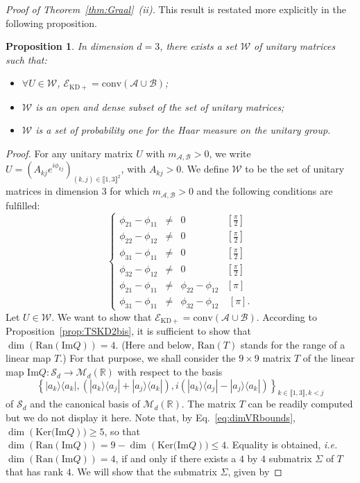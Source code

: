 \documentclass[a4paper, notitlepage, 11pt]{article}
\numberwithin{equation}{section}
\newcommand{\bra}[1]{\langle #1|}
\newcommand{\cket}[1]{|#1\rangle}
\newcommand{\mcl}[1]{\mathcal{#1}}
\newcommand{\Acal}{{\mathcal A}}
\newcommand{\Bcal}{{\mathcal B}}
\newcommand{\EcalKDC}{{\mathcal E}_{\mathrm{KD+}}}
\newcommand{\Ker}{{\mathrm{Ker}}}
\newcommand{\R}{\mathbb{R}}
\newcommand{\mab}{m_{\Acal,\Bcal}}
\newcommand{\conv}[1]{\mathrm{conv}\left(#1\right)}
\renewcommand{\Im}[1]{\mathrm{Im}#1}
\newcommand{\Ran}[1]{\mathrm{Ran}\left(#1\right)}
\newcommand{\SAO}{\mathcal{S}_{d}}
\newcommand{\MatR}[1]{\mcl{M}_{#1}(\R)}
\newcommand{\IntEnt}[2]{\llbracket #1 , #2 \rrbracket}
\newcommand{\convAB}{\conv{\Acal \cup \Bcal}}
\newtheorem{Prop}[Theorem]{Proposition}
\begin{document}
\noindent \emph{Proof of Theorem~\ref{thm:Graal}~(ii).}
This result is restated more explicitly  in the following proposition. 

\begin{Prop}
In dimension $d=3$, there exists a set $\mathcal W$ of unitary matrices such that:
\begin{itemize}
    \item $\forall U \in \mathcal W$, $\EcalKDC = \convAB$; 
    \item $\mathcal{W}$ is an open and dense subset of the set of unitary matrices;
    \item $\mathcal W$ is a set of probability one for the Haar measure on the unitary group.
\end{itemize}
\end{Prop}
\begin{proof}
For any unitary matrix $U$ with $\mab > 0$, we write $U = (A_{kj}e^{i\phi_{kj}})_{(k,j)\in\IntEnt{1}{3}^2}$, with $A_{kj} > 0$. We define $\mathcal W$ to be the set of unitary matrices in dimension 3 for which $\mab > 0$ and the following conditions are fulfilled: 
\begin{equation}\label{cond:rk4}
\left\{\begin{array}{rclc}
\phi_{21}-\phi_{11}& \neq &0& [\frac{\pi}{2}] \\
\phi_{22}-\phi_{12} &\neq& 0& [\frac{\pi}{2}] \\
\phi_{31}-\phi_{11}& \neq& 0& [\frac{\pi}{2}] \\
\phi_{32}-\phi_{12} &\neq &0& [\frac{\pi}{2}] \\
\phi_{21}-\phi_{11} &\neq &\phi_{22}-\phi_{12}& [\pi] \\
\phi_{31}-\phi_{11} &\neq &\phi_{32}-\phi_{12} & \ [\pi].
\end{array}\right. 
\end{equation}
 Let $U\in\mathcal W$. We want to show that $\EcalKDC = \convAB$. According to Proposition~\ref{prop:TSKD2bis}, it is sufficient to show that $\dim(\Ran{\Im{Q}})=4$. (Here and below, $\Ran{T}$ stands for the range of  a linear map $T$.) For that purpose, we shall consider the $9\times 9$ matrix $T$ of the linear map $\mathrm{Im}Q: \SAO   \rightarrow \MatR{d} $ with respect to the basis 
$$
\left\{\cket{a_k}\bra{a_k}, (\cket{a_k}\bra{a_j}+\cket{a_j}\bra{a_k}), i(\cket{a_k}\bra{a_j}-\cket{a_j}\bra{a_k})\right\}_{k\in\IntEnt{1}{3},k< j}
$$ 
of $\SAO$ and the canonical basis of $\MatR{d}$. The matrix $T$ can be readily computed but we do not display it here.  Note that, by Eq.~\eqref{eq:dimVRbounds}, $\dim(\Ker{(\Im{Q}})) \geqslant 5$, so that $\dim{(\Ran{\Im{Q}})} = 9 - \dim(\Ker{(\Im{Q}})) \leqslant 4$. Equality is obtained, \emph{i.e.} $\dim{(\Ran{\Im{Q}})}= 4$, if and only if  there exists a $4$ by $4$ submatrix $\Sigma$ of $T$ that has rank $4$. We will show that the submatrix $\Sigma$, given by 

\end{proof}
\end{document}
